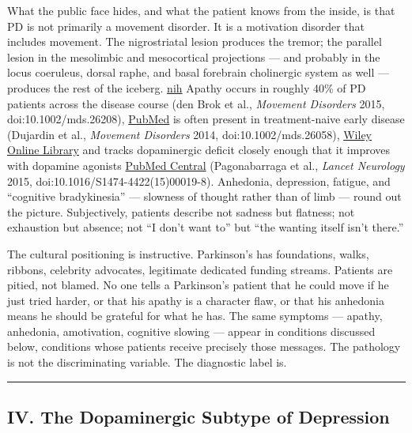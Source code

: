 What the public face hides, and what the patient knows from the inside, is that PD is not primarily a movement disorder. It is a motivation disorder that includes movement. The nigrostriatal lesion produces the tremor; the parallel lesion in the mesolimbic and mesocortical projections --- and probably in the locus coeruleus, dorsal raphe, and basal forebrain cholinergic system as well --- produces the rest of the iceberg. \href{https://www.ncbi.nlm.nih.gov/pmc/articles/PMC3263557/}{nih} Apathy occurs in roughly 40\% of PD patients across the disease course (den Brok et al., \emph{Movement Disorders} 2015, doi:10.1002/mds.26208), \href{https://pubmed.ncbi.nlm.nih.gov/25787145/}{PubMed} is often present in treatment-naive early disease (Dujardin et al., \emph{Movement Disorders} 2014, doi:10.1002/mds.26058), \href{https://movementdisorders.onlinelibrary.wiley.com/doi/10.1002/mds.26058}{Wiley Online Library} and tracks dopaminergic deficit closely enough that it improves with dopamine agonists \href{https://pmc.ncbi.nlm.nih.gov/articles/PMC3263557/}{PubMed Central} (Pagonabarraga et al., \emph{Lancet Neurology} 2015, doi:10.1016/S1474-4422(15)00019-8). Anhedonia, depression, fatigue, and ``cognitive bradykinesia'' --- slowness of thought rather than of limb --- round out the picture. Subjectively, patients describe not sadness but flatness; not exhaustion but absence; not ``I don't want to'' but ``the wanting itself isn't there.''

The cultural positioning is instructive. Parkinson's has foundations, walks, ribbons, celebrity advocates, legitimate dedicated funding streams. Patients are pitied, not blamed. No one tells a Parkinson's patient that he could move if he just tried harder, or that his apathy is a character flaw, or that his anhedonia means he should be grateful for what he has. The same symptoms --- apathy, anhedonia, amotivation, cognitive slowing --- appear in conditions discussed below, conditions whose patients receive precisely those messages. The pathology is not the discriminating variable. The diagnostic label is.

\begin{center}\rule{0.5\linewidth}{0.5pt}\end{center}

\subsection{IV. The Dopaminergic Subtype of Depression}\label{09_dopamine_spectrum-iv.-the-dopaminergic-subtype-of-depression}

